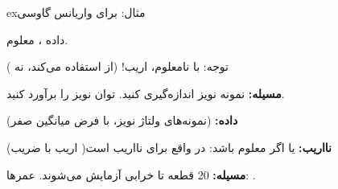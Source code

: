 \begin{PSbox}[unbreakable]{ex}{مثال:  برای واریانس گاوسی}

داده ، \lr{\ensuremath{\mu}} معلوم.




توجه: با \lr{\ensuremath{\mu}} نامعلوم،  اریب! (از  استفاده می‌کند، نه )

\end{PSbox}



\textbf{مسیله:}  نمونه نویز اندازه‌گیری کنید. توان نویز  را برآورد کنید.

\textbf{داده:}  (نمونه‌های ولتاژ نویز، با فرض میانگین صفر)

 (اریب با ضریب )\PSbr{}\textbf{نااریب:}  یا اگر  معلوم باشد:  در واقع برای  نااریب است


\textbf{مسیله:} 20 قطعه تا خرابی آزمایش می‌شوند. عمرها: .

